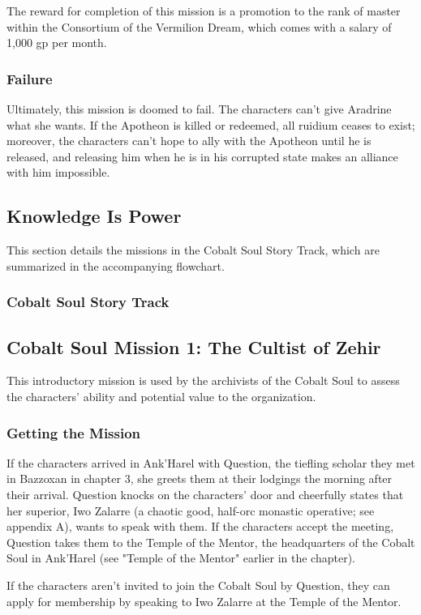 \documentclass[10pt,a4paper,twoside,bg=print,twocolumn,openany,nodeprecatedcode]{dndbook}
\begin{document}
The reward for completion of this mission is a promotion to the rank of master within the Consortium of the Vermilion Dream, which comes with a salary of 1,000 gp per month.

\subsubsection{Failure}
Ultimately, this mission is doomed to fail. The characters can't give Aradrine what she wants. If the Apotheon is killed or redeemed, all ruidium ceases to exist; moreover, the characters can't hope to ally with the Apotheon until he is released, and releasing him when he is in his corrupted state makes an alliance with him impossible.

\subsection{Knowledge Is Power}
This section details the missions in the Cobalt Soul Story Track, which are summarized in the accompanying flowchart.

\subsubsection{Cobalt Soul Story Track}
\subsection{Cobalt Soul Mission 1: The Cultist of Zehir}
This introductory mission is used by the archivists of the Cobalt Soul to assess the characters' ability and potential value to the organization.

\subsubsection{Getting the Mission}
If the characters arrived in Ank'Harel with Question, the tiefling scholar they met in Bazzoxan in chapter 3, she greets them at their lodgings the morning after their arrival. Question knocks on the characters' door and cheerfully states that her superior, Iwo Zalarre (a chaotic good, half-orc monastic operative; see appendix A), wants to speak with them. If the characters accept the meeting, Question takes them to the Temple of the Mentor, the headquarters of the Cobalt Soul in Ank'Harel (see "Temple of the Mentor" earlier in the chapter).

If the characters aren't invited to join the Cobalt Soul by Question, they can apply for membership by speaking to Iwo Zalarre at the Temple of the Mentor.
\end{document}
